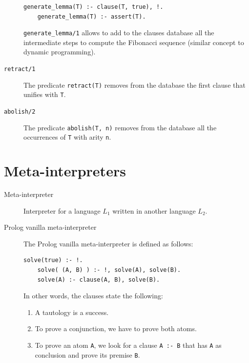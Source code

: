 \begin{description}
\begin{example}
\begin{lstlisting}[language={}]
    generate_lemma(T) :- clause(T, true), !.
    generate_lemma(T) :- assert(T).
            \end{lstlisting} 

            \texttt{generate\_lemma/1} allows to add to the clauses database all the intermediate steps to compute the Fibonacci sequence
            (similar concept to dynamic programming).
        \end{example}

    \item[\texttt{retract/1}] 
        The predicate \texttt{retract(T)} removes from the database the first clause that unifies with \texttt{T}.

    \item[\texttt{abolish/2}] 
        The predicate \texttt{abolish(T, n)} removes from the database all the occurrences of \texttt{T} with arity \texttt{n}.
\end{description}



\section{Meta-interpreters}

\begin{description}
    \item[Meta-interpreter] 
        Interpreter for a language $L_1$ written in another language $L_2$.

    \item[Prolog vanilla meta-interpreter] 
        The Prolog vanilla meta-interpreter is defined as follows:
        \begin{lstlisting}[language={}]
    solve(true) :- !.
    solve( (A, B) ) :- !, solve(A), solve(B).
    solve(A) :- clause(A, B), solve(B).
        \end{lstlisting}

        In other words, the clauses state the following:
        \begin{enumerate}
            \item A tautology is a success.
            \item To prove a conjunction, we have to prove both atoms.
            \item To prove an atom \texttt{A}, 
                we look for a clause \texttt{A :- B} that has \texttt{A} as conclusion and prove its premise \texttt{B}.
        \end{enumerate}
\end{description}